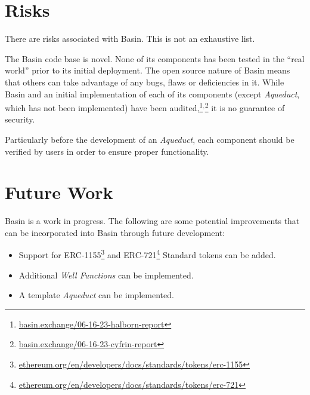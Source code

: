 \documentclass[tikz]{article}
\newcommand{\term}[1]{\textsl{#1}}
\newcommand{\fref}[1]{\footnote{\href{http://#1}{#1}}}
\begin{document}
\section{Risks}
There are risks associated with Basin. This is not an exhaustive list.

The Basin code base is novel. None of its components has been tested in the “real world” prior to its initial deployment. The open source nature of Basin means that others can take advantage of any bugs, flaws or deficiencies in it. While Basin and an initial implementation of each of its components (except \term{Aqueduct}, which has not been implemented) have been audited,\footnote{\href{https://basin.exchange/06-16-23-halborn-report}{basin.exchange/06-16-23-halborn-report}}$^{,}$\footnote{\href{https://basin.exchange/06-16-23-cyfrin-report}{basin.exchange/06-16-23-cyfrin-report}} it is no guarantee of security. 

Particularly before the development of an \term{Aqueduct}, each component should be verified by users in order to ensure proper functionality. 

\section{Future Work}
Basin is a work in progress. The following are some potential improvements that can be incorporated into Basin through future development:

\begin{itemize}
\item Support for ERC-1155\fref{ethereum.org/en/developers/docs/standards/tokens/erc-1155} and ERC-721\fref{ethereum.org/en/developers/docs/standards/tokens/erc-721} Standard tokens can be added.
\item Additional \term{Well Functions} can be implemented.
\item A template \term{Aqueduct} can be implemented.
\end{itemize}
\end{document}
